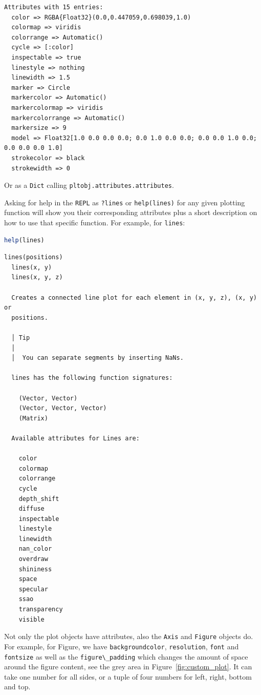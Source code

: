 \documentclass[
  notoc %
]{tufte-book}
\newcommand{\passthrough}[1]{#1}
\begin{document}
\begin{lstlisting}[language=Output]
Attributes with 15 entries:
  color => RGBA{Float32}(0.0,0.447059,0.698039,1.0)
  colormap => viridis
  colorrange => Automatic()
  cycle => [:color]
  inspectable => true
  linestyle => nothing
  linewidth => 1.5
  marker => Circle
  markercolor => Automatic()
  markercolormap => viridis
  markercolorrange => Automatic()
  markersize => 9
  model => Float32[1.0 0.0 0.0 0.0; 0.0 1.0 0.0 0.0; 0.0 0.0 1.0 0.0; 0.0 0.0 0.0 1.0]
  strokecolor => black
  strokewidth => 0
\end{lstlisting}

Or as a \passthrough{\lstinline!Dict!} calling
\passthrough{\lstinline!pltobj.attributes.attributes!}.

Asking for help in the \passthrough{\lstinline!REPL!} as
\passthrough{\lstinline!?lines!} or
\passthrough{\lstinline!help(lines)!} for any given plotting function
will show you their corresponding attributes plus a short description on
how to use that specific function. For example, for
\passthrough{\lstinline!lines!}:

\begin{lstlisting}[language=Julia]
help(lines)
\end{lstlisting}

\begin{lstlisting}[language=Output]
  lines(positions)
  lines(x, y)
  lines(x, y, z)

  Creates a connected line plot for each element in (x, y, z), (x, y) or
  positions.

  │ Tip
  │
  │  You can separate segments by inserting NaNs.

  lines has the following function signatures:

    (Vector, Vector)
    (Vector, Vector, Vector)
    (Matrix)

  Available attributes for Lines are:

    color
    colormap
    colorrange
    cycle
    depth_shift
    diffuse
    inspectable
    linestyle
    linewidth
    nan_color
    overdraw
    shininess
    space
    specular
    ssao
    transparency
    visible
\end{lstlisting}

Not only the plot objects have attributes, also the
\passthrough{\lstinline!Axis!} and \passthrough{\lstinline!Figure!}
objects do. For example, for Figure, we have
\passthrough{\lstinline!backgroundcolor!},
\passthrough{\lstinline!resolution!}, \passthrough{\lstinline!font!} and
\passthrough{\lstinline!fontsize!} as well as the
\passthrough{\lstinline!figure\_padding!} which changes the amount of
space around the figure content, see the grey area in
Figure~\ref{fig:custom_plot}. It can take one number for all sides, or a
tuple of four numbers for left, right, bottom and top.
\end{document}
